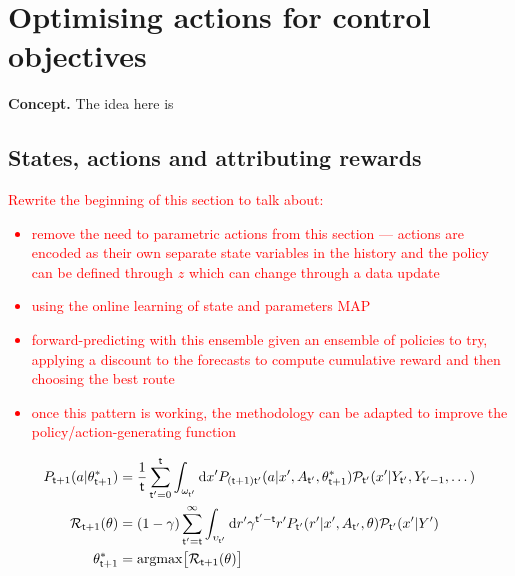 \chapter{\sffamily Optimising actions for control objectives}

{\bfseries\sffamily Concept.} The idea here is 

\section{\sffamily States, actions and attributing rewards}

\textcolor{red}{Rewrite the beginning of this section to talk about:
\begin{itemize}
\item{remove the need to parametric actions from this section --- actions are encoded as their own separate state variables in the history and the policy can be defined through $z$ which can change through a data update}
\item{using the online learning of state and parameters MAP}
\item{forward-predicting with this ensemble given an ensemble of policies to try, applying a discount to the forecasts to compute cumulative reward and then choosing the best route}
\item{once this pattern is working, the methodology can be adapted to improve the policy/action-generating function}    
\end{itemize}
\begin{align}
P_{{\sf t}+1}(a\vert \theta^*_{{\sf t}+1}) &= \frac{1}{{\sf t}}\sum_{{\sf t}'=0}^{{\sf t}}\int_{\omega_{{\sf t}'}} {\rm d}x'P_{({\sf t}+1){\sf t}'}(a\vert x', A_{{\sf t}'},\theta^*_{{\sf t}+1}){\cal P}_{{\sf t}'}(x'\vert Y_{{\sf t}'}, Y_{{\sf t}'-1}, \dots) \\
{\cal R}_{{\sf t}+1}(\theta) &=(1-\gamma)\sum_{{\sf t}'={\sf t}}^{\infty}\int_{\upsilon_{{\sf t}'}} {\rm d}r' \gamma^{{\sf t}'-{\sf t}}r'P_{{\sf t}'}(r'\vert x', A_{{\sf t}'},\theta ){\cal P}_{{\sf t}'}(x'\vert Y') \\
\theta^*_{{\sf t}+1} &= {\rm argmax} \big[ {\cal R}_{{\sf t}+1}(\theta)\big]
\end{align}
}


